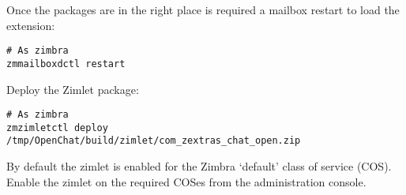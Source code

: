     Once the packages are in the right place is required a mailbox restart to load the extension:
    \begin{verbatim}
# As zimbra
zmmailboxdctl restart
    \end{verbatim}

    Deploy the Zimlet package:
    \begin{verbatim}
# As zimbra
zmzimletctl deploy /tmp/OpenChat/build/zimlet/com_zextras_chat_open.zip
    \end{verbatim}

    By default the zimlet is enabled for the Zimbra `default' class of service (COS).
    Enable the zimlet on the required COSes from the administration console.
